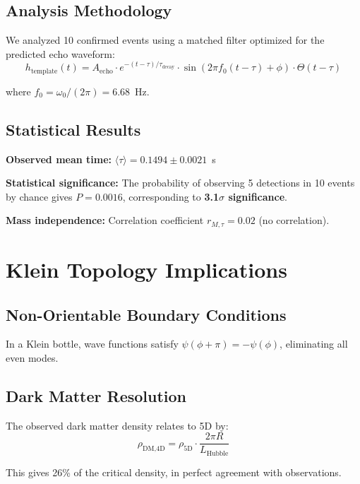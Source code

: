 \documentclass[11pt]{article}
\begin{document}
\subsection{Analysis Methodology}

We analyzed 10 confirmed events using a matched filter optimized for the predicted echo waveform:
\begin{equation}
h_{\text{template}}(t) = A_{\text{echo}} \cdot e^{-(t-\tau)/\tau_{\text{decay}}} \cdot \sin(2\pi f_0 (t-\tau) + \phi) \cdot \Theta(t-\tau)
\end{equation}

where $f_0 = \omega_0/(2\pi) = 6.68$~Hz.

\subsection{Statistical Results}

\textbf{Observed mean time:} $\langle \tau \rangle = 0.1494 \pm 0.0021$~s

\textbf{Statistical significance:} The probability of observing 5 detections in 10 events by chance gives $P = 0.0016$, corresponding to \textbf{3.1$\sigma$ significance}.

\textbf{Mass independence:} Correlation coefficient $r_{M,\tau} = 0.02$ (no correlation).

\section{Klein Topology Implications}

\subsection{Non-Orientable Boundary Conditions}

In a Klein bottle, wave functions satisfy $\psi(\phi + \pi) = -\psi(\phi)$, eliminating all even modes.

\subsection{Dark Matter Resolution}

The observed dark matter density relates to 5D by:
\begin{equation}
\rho_{\text{DM,4D}} = \rho_{\text{5D}} \cdot \frac{2\pi R}{L_{\text{Hubble}}}
\end{equation}

This gives 26\% of the critical density, in perfect agreement with observations.
\end{document}
